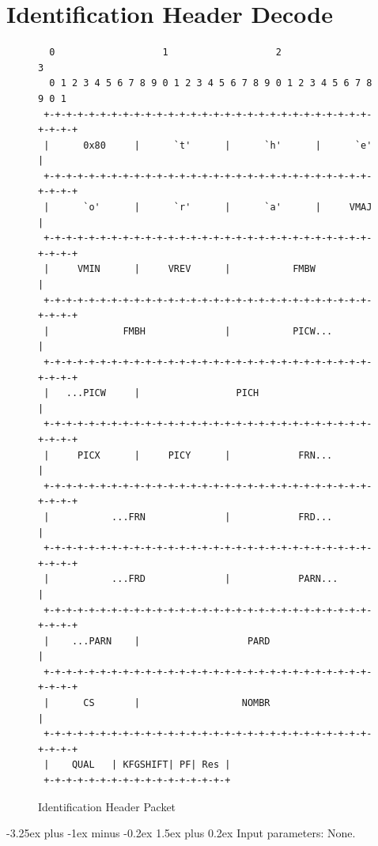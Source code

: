 \documentclass[9pt,letterpaper]{book}
\makeatletter
\numberwithin{equation}{chapter}
\numberwithin{figure}{chapter}
\numberwithin{table}{chapter}
\renewcommand{\paragraph}{\@startsection{paragraph}{4}{0ex}%
 {-3.25ex plus -1ex minus -0.2ex}%
 {1.5ex plus 0.2ex}%
 {\normalfont\normalsize\bfseries}}
\makeatother
\begin{document}
\section{Identification Header Decode}
\label{sec:idheader}

\begin{figure}[H]
\begin{center}
\begin{verbatim}
  0                   1                   2                   3   
  0 1 2 3 4 5 6 7 8 9 0 1 2 3 4 5 6 7 8 9 0 1 2 3 4 5 6 7 8 9 0 1 
 +-+-+-+-+-+-+-+-+-+-+-+-+-+-+-+-+-+-+-+-+-+-+-+-+-+-+-+-+-+-+-+-+
 |      0x80     |      `t'      |      `h'      |      `e'      |
 +-+-+-+-+-+-+-+-+-+-+-+-+-+-+-+-+-+-+-+-+-+-+-+-+-+-+-+-+-+-+-+-+
 |      `o'      |      `r'      |      `a'      |     VMAJ      |
 +-+-+-+-+-+-+-+-+-+-+-+-+-+-+-+-+-+-+-+-+-+-+-+-+-+-+-+-+-+-+-+-+
 |     VMIN      |     VREV      |           FMBW                |
 +-+-+-+-+-+-+-+-+-+-+-+-+-+-+-+-+-+-+-+-+-+-+-+-+-+-+-+-+-+-+-+-+
 |             FMBH              |           PICW...             |
 +-+-+-+-+-+-+-+-+-+-+-+-+-+-+-+-+-+-+-+-+-+-+-+-+-+-+-+-+-+-+-+-+
 |   ...PICW     |                 PICH                          |
 +-+-+-+-+-+-+-+-+-+-+-+-+-+-+-+-+-+-+-+-+-+-+-+-+-+-+-+-+-+-+-+-+
 |     PICX      |     PICY      |            FRN...             |
 +-+-+-+-+-+-+-+-+-+-+-+-+-+-+-+-+-+-+-+-+-+-+-+-+-+-+-+-+-+-+-+-+
 |           ...FRN              |            FRD...             |
 +-+-+-+-+-+-+-+-+-+-+-+-+-+-+-+-+-+-+-+-+-+-+-+-+-+-+-+-+-+-+-+-+
 |           ...FRD              |            PARN...            |
 +-+-+-+-+-+-+-+-+-+-+-+-+-+-+-+-+-+-+-+-+-+-+-+-+-+-+-+-+-+-+-+-+
 |    ...PARN    |                   PARD                        |
 +-+-+-+-+-+-+-+-+-+-+-+-+-+-+-+-+-+-+-+-+-+-+-+-+-+-+-+-+-+-+-+-+
 |      CS       |                  NOMBR                        |
 +-+-+-+-+-+-+-+-+-+-+-+-+-+-+-+-+-+-+-+-+-+-+-+-+-+-+-+-+-+-+-+-+
 |    QUAL   | KFGSHIFT| PF| Res |
 +-+-+-+-+-+-+-+-+-+-+-+-+-+-+-+-+
\end{verbatim}
\end{center}
\caption{Identification Header Packet}
\label{fig:idheader}
\end{figure}

\paragraph{Input parameters:} None.
\end{document}
